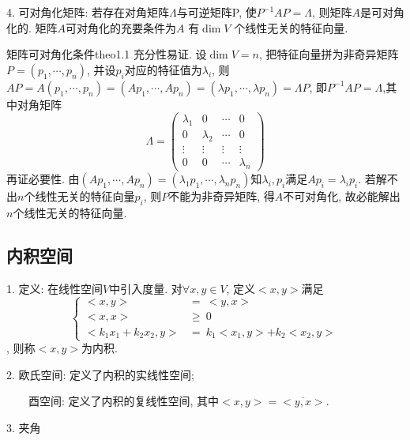     4. 可对角化矩阵: 若存在对角矩阵$\Lambda$与可逆矩阵P, 使$P^{-1}AP=\Lambda$, 则矩阵$A$是可对角化的. 矩阵$A$可对角化的充要条件为$A$ 有$\dim V$ 个线性无关的特征向量.
    
    \begin{theo}{矩阵可对角化条件}{theo1.1}
        充分性易证. 设$\dim V=n$, 把特征向量拼为非奇异矩阵$P=(p_1,\cdots,p_n)$, 并设$p_i$对应的特征值为$\lambda_i$, 则
        $AP=A(p_1,\cdots,p_n)=(Ap_1,\cdots,Ap_n)=(\lambda p_1,\cdots,\lambda p_n)=\Lambda P$, 即$P^{-1}AP=\Lambda$,其中对角矩阵
        \begin{equation*}
            \Lambda=\begin{pmatrix}
                \lambda_1 & 0 & \cdots &0\\
                0 &\lambda_2  & \cdots &0\\
                \vdots &\vdots &\vdots &\vdots\\
                0&0&\cdots &\lambda_n
            \end{pmatrix}
        \end{equation*}
        再证必要性. 由$(Ap_1,\cdots,Ap_n)=(\lambda_1 p_1,\cdots,\lambda_n p_n)$知$\lambda_i,p_i$满足$Ap_i=\lambda_i p_i$. 
        若解不出$n$个线性无关的特征向量$p_i$, 则$P$不能为非奇异矩阵, 得$A$不可对角化, 故必能解出$n$个线性无关的特征向量.
    \end{theo}

\subsection{内积空间}

1. 定义: 在线性空间$V$中引入度量. 对$\forall x,y \in V$, 定义$<x,y>$满足
\begin{equation*}
    \left\{ \begin{aligned}
        <x,y>&=~<y,x>\\
        <x,x>&\geq~0\\
        <k_1x_1+k_2x_2,y>&=~k_1<x_1,y>+k_2<x_2,y>
    \end{aligned}\right.
\end{equation*}, 则称$<x,y>$为内积.

2. 欧氏空间: 定义了内积的实线性空间; 
   
~~~~酉空间: 定义了内积的复线性空间, 其中$<x,y>=\overline{<y,x>}$.

3. 夹角

